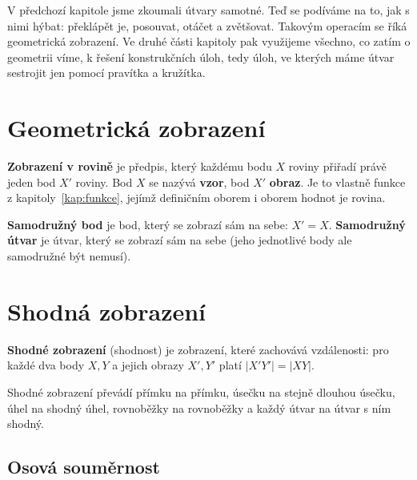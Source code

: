 \label{kap:zobrazeni}

V předchozí kapitole jsme zkoumali útvary samotné. Teď se podíváme na to, jak s nimi hýbat: překlápět je, posouvat, otáčet a zvětšovat. Takovým operacím se říká geometrická zobrazení. Ve druhé části kapitoly pak využijeme všechno, co zatím o geometrii víme, k řešení konstrukčních úloh, tedy úloh, ve kterých máme útvar sestrojit jen pomocí pravítka a kružítka.

\section{Geometrická zobrazení}\label{sec:geom-zobrazeni}

\begin{definitionbox}
  \textbf{Zobrazení v rovině} je předpis, který každému bodu $X$ roviny přiřadí právě jeden bod $X'$ roviny. Bod $X$ se nazývá \textbf{vzor}, bod $X'$ \textbf{obraz}. Je to vlastně funkce z kapitoly~\ref{kap:funkce}, jejímž definičním oborem i oborem hodnot je rovina.

  \vspace{0.2cm}

  \textbf{Samodružný bod} je bod, který se zobrazí sám na sebe: $X' = X$. \textbf{Samodružný útvar} je útvar, který se zobrazí sám na sebe (jeho jednotlivé body ale samodružné být nemusí).
\end{definitionbox}

\section{Shodná zobrazení}\label{sec:shodna-zobrazeni}

\begin{definitionbox}
  \textbf{Shodné zobrazení} (shodnost) je zobrazení, které zachovává vzdálenosti: pro každé dva body $X, Y$ a jejich obrazy $X', Y'$ platí $|X'Y'| = |XY|$.

  \vspace{0.2cm}

  Shodné zobrazení převádí přímku na přímku, úsečku na stejně dlouhou úsečku, úhel na shodný úhel, rovnoběžky na rovnoběžky a každý útvar na útvar s ním shodný.
\end{definitionbox}

\subsection{Osová souměrnost}\label{sec:osova-soumernost}

